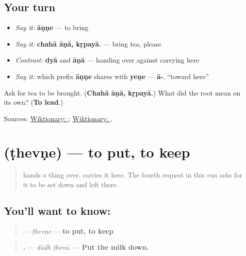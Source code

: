 \subsection*{Your turn}
\begin{itemize}
\raggedright
  \item \emph{Say it:} \textbf{āṇṇe} — to bring
  \item \emph{Say it:} \textbf{chahā āṇā, kṛpayā.} — bring tea, please
  \item \emph{Contrast:} \textbf{dyā} and \textbf{āṇā} — handing over against carrying here
  \item \emph{Say it:} which prefix \textbf{āṇṇe} shares with \textbf{yeṇe} — \textbf{ā-}, \textquotedblleft{}toward here\textquotedblright{}
\end{itemize}

\begin{tcolorbox}[breakable,colback=teal!4,colframe=teal!35!black,title={Before you move on}]
Ask for tea to be brought. (\textbf{Chahā āṇā, kṛpayā.}) What did the root \textbf{} mean on its own? (\textbf{To lead}.)

Sources: \href{https://en.wiktionary.org/wiki/\%E0\%A4\%86\%E0\%A4\%A3\%E0\%A4\%A3\%E0\%A5\%87}{Wiktionary: }; \href{https://en.wiktionary.org/wiki/\%E0\%A4\%A8\%E0\%A5\%80}{Wiktionary: }.
\end{tcolorbox}
\section[ṭhevṇe]{ (ṭhevṇe) — to put, to keep}

\label{lesson:MR-C22-thevne}



\begin{quote}
\textbf{} hands a thing over. \textbf{} carries it here. The fourth request in this run asks for it to be set down and left there.
\end{quote}

\subsection*{You'll want to know: }
\begin{quote}
\textbf{} — \emph{ṭhevṇe} — \textbf{to put, to keep}
\end{quote}

\begin{quote}
\textbf{ .} — \emph{dūdh ṭhevā.} — \textbf{Put the milk down.}
\end{quote}

